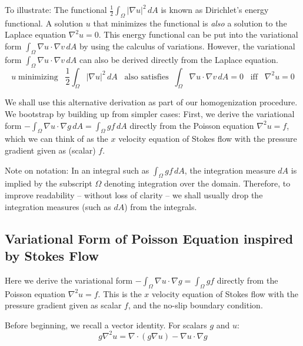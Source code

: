 \documentclass[12pt, a4paper, twoside, openright]{book}
\begin{document}
To illustrate:  The functional $ \frac{1}{2} \int_{\Omega} |\nabla u|^2 \,dA $ 
is known as Dirichlet's energy functional.  A solution $u$ that minimizes the functional is \emph{also} a solution to the Laplace equation $ \nabla^2 u = 0 $.
This energy functional can be put into the variational form $ \int_{\Omega} \nabla u \cdot \nabla v \,dA $ by using the calculus of variations.  However, the variational form $ \int_{\Omega} \nabla u \cdot \nabla v \,dA $ can also be derived directly from the Laplace equation.
\begin{equation}
u \; \text{minimizing} \;\;\; \frac{1}{2} \int_{\Omega} |\nabla u|^2 \,dA
\;\;\; \text{also satisfies} \;\; \int_{\Omega} \nabla u \cdot \nabla v \,dA = 0
\;\;\; \text{iff} \;\;\; \nabla^2 u =0 
\end{equation}

We shall use this alternative derivation as part of our homogenization procedure.
We bootstrap by building up from simpler cases:  First, we derive the variational form $ - \int_{\Omega} \nabla u \cdot \nabla g \,dA = \int_{\Omega} g f \,dA $ directly from the Poisson equation $ \nabla^2 u = f$, which we can think of as the $x$ velocity equation of Stokes flow with the pressure gradient given as (scalar) $f$.

Note on notation:  In an integral such as $ \int_{\Omega} g f \,dA $, the integration measure $dA$ is implied by the subscript $\Omega$ denoting integration over the domain.  Therefore, to improve readability -- without loss of clarity -- we shall usually drop the integration measures (such as $dA$) from the integrals.

\subsection{Variational Form of Poisson Equation inspired by Stokes Flow}

Here we derive the variational form $ - \int_{\Omega} \nabla u \cdot \nabla g = \int_{\Omega} g f $ directly from the Poisson equation $ \nabla^2 u = f$.  This is the $x$ velocity equation of Stokes flow with the pressure gradient given as scalar $f$, and the no-slip boundary condition.

Before beginning, we recall a vector identity.  For scalars $g$ and $u$:
\begin{equation}
g \nabla^2 u = \nabla \cdot (g \nabla u) - \nabla u \cdot \nabla g
\end{equation}
\end{document}
